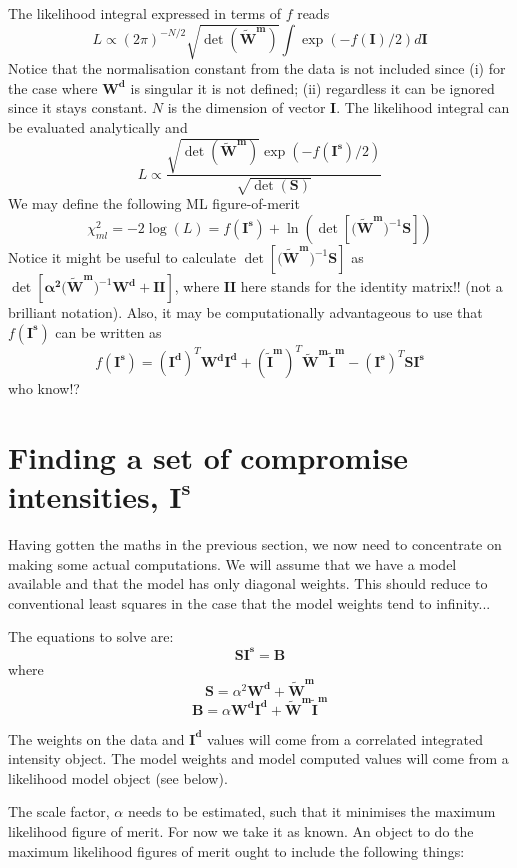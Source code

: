 \documentclass[10pt,a4paper,twoside,notitlepage]{report}
\newcommand{\mb}  [1] {\mathbf{#1}}
\begin{document}
The likelihood integral expressed in terms of $f$ reads
\[ L \propto (2\pi )^{-N/2}\sqrt{\det (\mb{\tilde{W}^m})}\int \exp (-f(\mb{I})/2) d\mb{I} \]
Notice that the normalisation constant from the data is not included
since (i) for the case where $\mb{W^d}$ is singular it is not defined; (ii)
regardless it can be ignored since it stays constant. $N$ is the
dimension of vector $\mb{I}$. The likelihood integral can be
evaluated analytically and   
\[ L \propto \frac{\sqrt{\det(\mb{\tilde{W}^m})} \exp (-f(\mb{I^s})/2)}{
  \sqrt{\det (\mb{S}) }} \]
We may define the following ML figure-of-merit
\[ \chi^2_{ml}=-2\log(L)=f(\mb{I^s})+\ln(\det [\mb{(\tilde{W}^m})^{-1}\mb{S}])
\]
Notice it might be useful to calculate $\det
[\mb{(\tilde{W}^m})^{-1}\mb{S}]$ as $\det [\mb{\alpha^2 (\tilde{W}^m})^{-1}
  \mb{W^d}+\mb{II}]$, where $\mb{II}$ here stands for the identity
matrix!! (not a brilliant notation). Also, it may be computationally
advantageous to use that $f(\mb{I^s})$ can be written as
\[ f(\mb{I^s}) = (\mb{I^d})^T \mb{W^d} \mb{I^d} + (\mb{\tilde{I}^m})^T 
\mb{\tilde{W}^m} \mb{\tilde{I}^m} -(\mb{I^s})^T \mb{S} \mb{I^s} \]
who know!?


\section{Finding a set of compromise intensities, $\mb{I^s}$}

Having gotten the maths in the previous section, we now need to concentrate
on making some actual computations. 
We will assume that we have a model available and that the model has only
diagonal weights.
This should reduce to conventional least squares in the case that the model
weights tend to infinity...

The equations to solve are:
\[ \mb{S I^s}=\mb{B} \]
where
\[ \mb{S} = \alpha^2\mb{W^d} + \mb{\tilde{W}^m} \]
\[ \mb{B} =  \alpha \mb{W^d} \mb{I^d} +
\mb{\tilde{W}^m}\mb{\tilde{I}^m} \]

The weights on the data and $ \mb{I^d}$ values will come from a correlated 
integrated intensity object.
The model weights and model computed values will come from a likelihood
model object (see below).

The scale factor, $\alpha$ needs to be estimated, such that it minimises the
maximum likelihood figure of merit. For now we take it as known. 
An object to do the maximum likelihood figures of merit ought to include
the following things:
\end{document}
